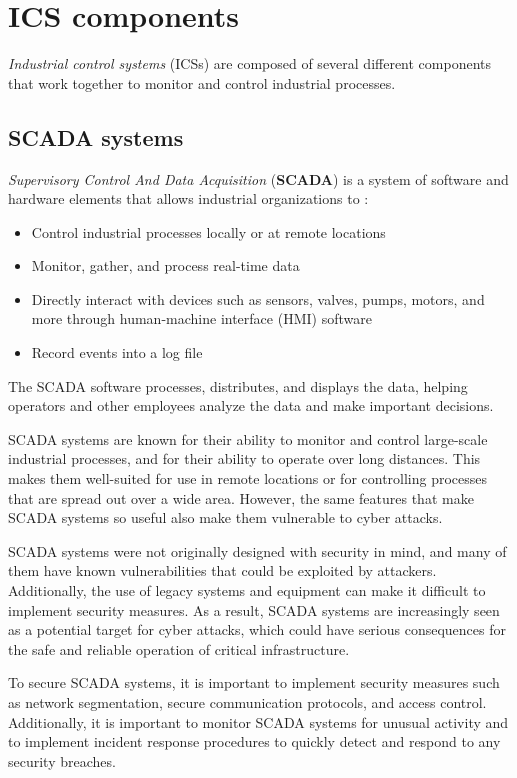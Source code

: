 \section{ICS components}
\label{sec:ics_components}
\textit{Industrial control systems} (ICSs) are composed of several different components that work together to monitor and control industrial processes. 

\subsection{SCADA systems}
\textit{Supervisory Control And Data Acquisition} (\textbf{SCADA}) is a system of software and hardware elements that allows industrial organizations to \cite{scada_definition}:
\begin{itemize}
	\item Control industrial processes locally or at remote locations
	\item Monitor, gather, and process real-time data
	\item Directly interact with devices such as sensors, valves, pumps, motors, and more through human-machine interface (HMI) software
	\item Record events into a log file
\end{itemize}

The SCADA software processes, distributes, and displays the data, helping operators and other employees analyze the data and make important decisions.

\bigskip
SCADA systems are known for their ability to monitor and control large-scale industrial processes, and for their ability to operate over long distances. This makes them well-suited for use in remote locations or for controlling processes that are spread out over a wide area. However, the same features that make SCADA systems so useful also make them vulnerable to cyber attacks.

SCADA systems were not originally designed with security in mind, and many of them have known vulnerabilities that could be exploited by attackers. Additionally, the use of legacy systems and equipment can make it difficult to implement security measures. As a result, SCADA systems are increasingly seen as a potential target for cyber attacks, which could have serious consequences for the safe and reliable operation of critical infrastructure.

To secure SCADA systems, it is important to implement security measures such as network segmentation, secure communication protocols, and access control. Additionally, it is important to monitor SCADA systems for unusual activity and to implement incident response procedures to quickly detect and respond to any security breaches.

